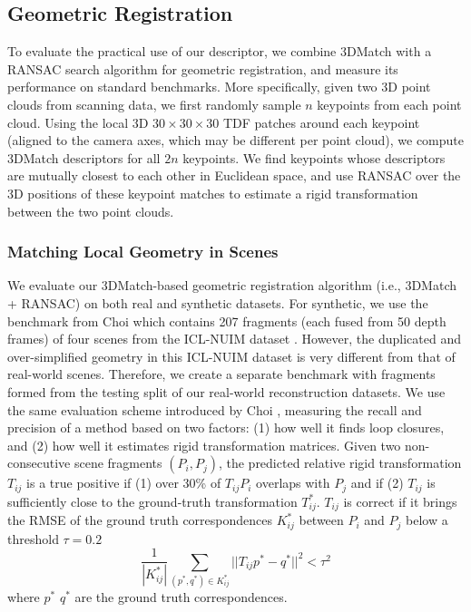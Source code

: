 \documentclass[10pt,twocolumn,letterpaper]{article}
\begin{document}
\subsection{Geometric Registration}
\label{sec:geometric-registration}

To evaluate the practical use of our descriptor, we combine 3DMatch with a RANSAC search algorithm for geometric registration, and measure its performance on standard benchmarks. More specifically, given two 3D point clouds from scanning data, we first randomly sample $n$ keypoints from each point cloud. Using the local 3D $30\times{30}\times{30}$ TDF patches around each keypoint (aligned to the camera axes, which may be different per point cloud), we compute 3DMatch descriptors for all $2n$ keypoints. We find keypoints whose descriptors are mutually closest to each other in Euclidean space, and use RANSAC over the 3D positions of these keypoint matches to estimate a rigid transformation between the two point clouds.

\subsubsection{Matching Local Geometry in Scenes}

We evaluate our 3DMatch-based geometric registration algorithm (i.e., 3DMatch + RANSAC) on both real and synthetic datasets. For synthetic, we use the benchmark from Choi \etal \cite{choi2015robust} which contains 207 fragments (each fused from 50 depth frames) of four scenes from the ICL-NUIM dataset \cite{handa2014iclnuim}. However, the duplicated and over-simplified geometry in this ICL-NUIM dataset is very different from that of real-world scenes. Therefore, we create a separate benchmark with fragments formed from the testing split of our real-world reconstruction datasets.
We use the same evaluation scheme introduced by Choi \etal \cite{choi2015robust}, measuring the recall and precision of a method based on two factors: (1) how well it finds loop closures, and (2) how well it estimates rigid transformation matrices. Given two non-consecutive scene fragments $(P_i,P_j)$, the predicted relative rigid transformation $T_{ij}$ is a true positive if (1) over 30\% of $T_{ij}P_i$ overlaps with $P_j$ and if (2) $T_{ij}$ is sufficiently close to the ground-truth transformation $T^{*}_{ij}$. $T_{ij}$ is correct if it brings the RMSE of the ground truth correspondences $K^*_{ij}$ between $P_i$ and $P_j$ below a threshold $\tau = 0.2$
\begin{equation}
\frac{1}{|K^*_{ij}|}\sum_{(p^*,q^*) \in K^*_{ij}}{ ||T_{ij}p^*-q^* ||^2 < \tau^2 }
\label{eq:tau}
\end{equation}
where $p^*$ $q^*$ are the ground truth correspondences.
\end{document}
